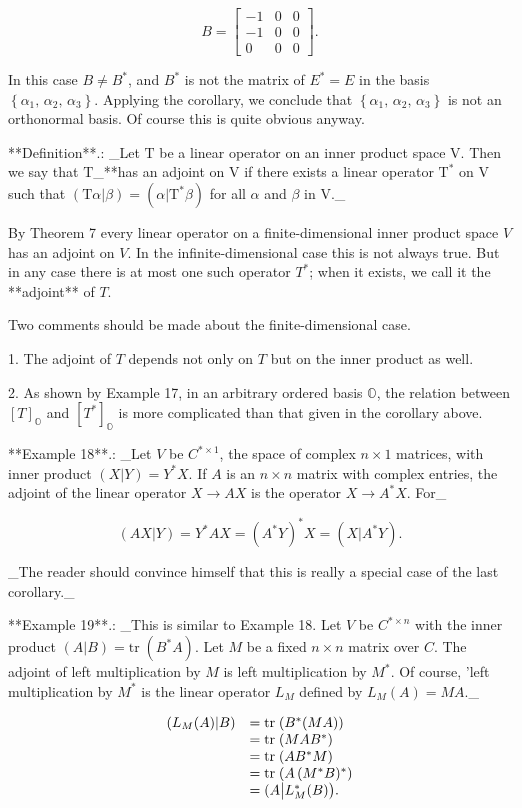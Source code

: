 \[B=\left[\begin{array}{ccc}-1&0&0\\ -1&0&0\\ 0&0&0\end{array}\right].\]

In this case \(B\neq B^{*}\), and \(B^{*}\) is not the matrix of \(E^{*}=E\) in the basis \(\left\{\alpha_{1},\,\alpha_{2},\,\alpha_{3}\right\}.\) Applying the corollary, we conclude that \(\left\{\alpha_{1},\,\alpha_{2},\,\alpha_{3}\right\}\) is not an orthonormal basis. Of course this is quite obvious anyway.

**Definition**.: _Let \(\mathrm{T}\) be a linear operator on an inner product space \(\mathrm{V}\). Then we say that \(\mathrm{T}\)_**has an adjoint on \(\mathrm{V}\) if there exists a linear operator \(\mathrm{T}^{*}\) on \(\mathrm{V}\) such that \((\mathrm{T}\alpha|\beta)=(\alpha|\mathrm{T}^{*}\beta)\) for all \(\alpha\) and \(\beta\) in \(\mathrm{V}\)._

By Theorem 7 every linear operator on a finite-dimensional inner product space \(V\) has an adjoint on \(V\). In the infinite-dimensional case this is not always true. But in any case there is at most one such operator \(T^{*}\); when it exists, we call it the **adjoint** of \(T\).

Two comments should be made about the finite-dimensional case.

1. The adjoint of \(T\) depends not only on \(T\) but on the inner product as well.

2. As shown by Example 17, in an arbitrary ordered basis \(\mathbb{O}\), the relation between \([T]_{\mathbb{O}}\) and \([T^{*}]_{\mathbb{O}}\) is more complicated than that given in the corollary above.

**Example 18**.: _Let \(V\) be \(C^{*\times 1}\), the space of complex \(n\times 1\) matrices, with inner product \((X|Y)=Y^{*}X\). If \(A\) is an \(n\times n\) matrix with complex entries, the adjoint of the linear operator \(X\to AX\) is the operator \(X\to A^{*}X\). For_

\[(AX|Y)=Y^{*}AX=(A^{*}Y)^{*}X=(X|A^{*}Y).\]

_The reader should convince himself that this is really a special case of the last corollary._

**Example 19**.: _This is similar to Example 18. Let \(V\) be \(C^{*\times n}\) with the inner product \((A|B)=\mathrm{tr}\;(B^{*}A)\). Let \(M\) be a fixed \(n\times n\) matrix over \(C\). The adjoint of left multiplication by \(M\) is left multiplication by \(M^{*}\). Of course, 'left multiplication by \(M^{*}\) is the linear operator \(L_{M}\) defined by \(L_{M}(A)=MA\)._

\[\begin{array}{rl}(L_{M}(A)|B)&=\mathrm{tr}\;(B^{*}(MA))\\ &=\mathrm{tr}\;(MAB^{*})\\ &=\mathrm{tr}\;(AB^{*}M)\\ &=\mathrm{tr}\;(A\,(M^{*}B)^{*})\\ &=(A\big{|}L_{M}^{*}(B)\big{)}.\end{array}\] 